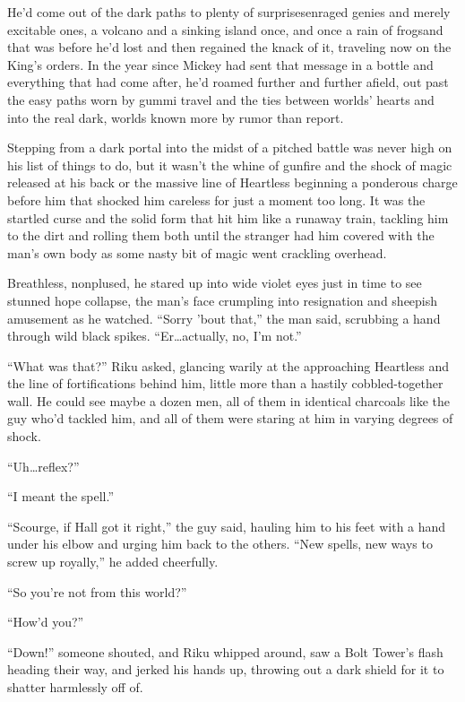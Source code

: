 

He'd come out of the dark paths to plenty of surprises\textemdash enraged genies and merely excitable ones, a volcano and a sinking island once, and once a rain of frogs\textemdash and that was before he'd lost and then regained the knack of it, traveling now on the King's orders. In the year since Mickey had sent that message in a bottle and everything that had come after, he'd roamed further and further afield, out past the easy paths worn by gummi travel and the ties between worlds' hearts and into the real dark, worlds known more by rumor than report.

Stepping from a dark portal into the midst of a pitched battle was never high on his list of things to do, but it wasn't the whine of gunfire and the shock of magic released at his back or the massive line of Heartless beginning a ponderous charge before him that shocked him careless for just a moment too long. It was the startled curse and the solid form that hit him like a runaway train, tackling him to the dirt and rolling them both until the stranger had him covered with the man's own body as some nasty bit of magic went crackling overhead.

Breathless, nonplused, he stared up into wide violet eyes just in time to see stunned hope collapse, the man's face crumpling into resignation and sheepish amusement as he watched.
``Sorry 'bout that,'' the man said, scrubbing a hand through wild black spikes. ``Er\ldots actually, no, I'm not.''

``What was that?'' Riku asked, glancing warily at the approaching Heartless and the line of fortifications behind him, little more than a hastily cobbled-together wall. He could see maybe a dozen men, all of them in identical charcoals like the guy who'd tackled him, and all of them were staring at him in varying degrees of shock.

``Uh\ldots reflex?''

``I meant the spell.''

``Scourge, if Hall got it right,'' the guy said, hauling him to his feet with a hand under his elbow and urging him back to the others. ``New spells, new ways to screw up royally,'' he added cheerfully.

``So you're not from this world?''

``How'd you\textemdash ?''

``Down!'' someone shouted, and Riku whipped around, saw a Bolt Tower's flash heading their way, and jerked his hands up, throwing out a dark shield for it to shatter harmlessly off of.

